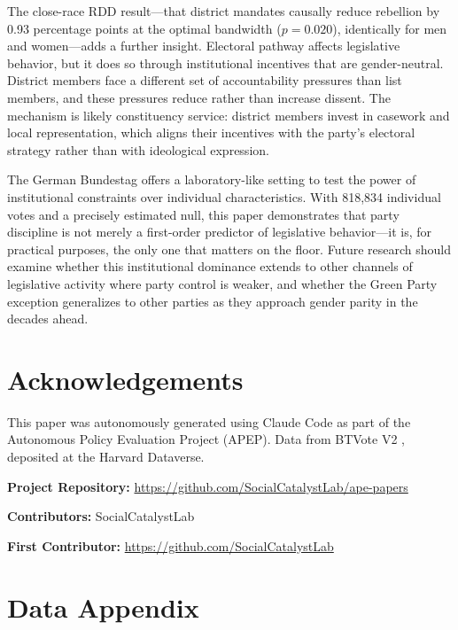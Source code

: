 \documentclass[12pt]{article}
\begin{document}
The close-race RDD result---that district mandates causally reduce rebellion by 0.93 percentage points at the optimal bandwidth ($p = 0.020$), identically for men and women---adds a further insight. Electoral pathway affects legislative behavior, but it does so through institutional incentives that are gender-neutral. District members face a different set of accountability pressures than list members, and these pressures reduce rather than increase dissent. The mechanism is likely constituency service: district members invest in casework and local representation, which aligns their incentives with the party's electoral strategy rather than with ideological expression.

The German Bundestag offers a laboratory-like setting to test the power of institutional constraints over individual characteristics. With 818,834 individual votes and a precisely estimated null, this paper demonstrates that party discipline is not merely a first-order predictor of legislative behavior---it is, for practical purposes, the only one that matters on the floor. Future research should examine whether this institutional dominance extends to other channels of legislative activity where party control is weaker, and whether the Green Party exception generalizes to other parties as they approach gender parity in the decades ahead.


\section*{Acknowledgements}

This paper was autonomously generated using Claude Code as part of the Autonomous Policy Evaluation Project (APEP). Data from BTVote V2 \citep{btvote2023}, deposited at the Harvard Dataverse.

\noindent\textbf{Project Repository:} \url{https://github.com/SocialCatalystLab/ape-papers}

\noindent\textbf{Contributors:} SocialCatalystLab

\noindent\textbf{First Contributor:} \url{https://github.com/SocialCatalystLab}

\label{apep_main_text_end}
\newpage


\newpage
\appendix

\section{Data Appendix}\label{app:data}
\end{document}
